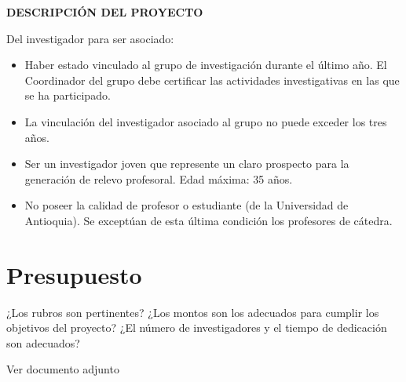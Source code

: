 \documentclass[11pt]{article}
\begin{document}
\begin{center}
  \textbf{\large DESCRIPCIÓN DEL PROYECTO}
\end{center}

\begin{instrucciones}
  Del investigador para ser asociado:
  \begin{itemize}
  \item  Haber estado vinculado al grupo de investigación durante el último año. El Coordinador del grupo debe certificar las actividades investigativas en las que se ha participado.

  \item La vinculación del investigador asociado al grupo no puede exceder los tres años.

  \item Ser un investigador joven que represente un claro prospecto para la generación de relevo profesoral. Edad máxima: 35 años.

  \item No poseer la calidad de profesor o estudiante (de la Universidad de Antioquia). Se exceptúan de esta última condición los profesores de cátedra.
  \end{itemize}
\end{instrucciones}













\section{ Presupuesto}
\begin{instrucciones}
  ¿Los rubros son pertinentes? ¿Los montos son los adecuados para cumplir los objetivos del proyecto? ¿El número de investigadores y el tiempo de dedicación son adecuados?
\end{instrucciones}
Ver documento adjunto


\end{document}
